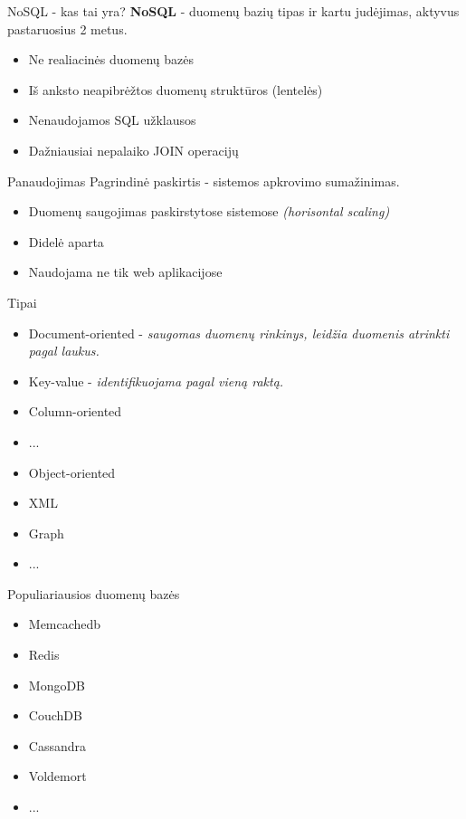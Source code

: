 \documentclass[12pt,a4paper]{beamer}
\begin{document}
\begin{frame}{NoSQL - kas tai yra?}
	\textbf{NoSQL} - duomenų bazių tipas ir kartu judėjimas, aktyvus pastaruosius 2 metus.
	\vskip10pt
	\begin{itemize}
		\item Ne realiacinės duomenų bazės
		\item Iš anksto neapibrėžtos duomenų struktūros (lentelės)
		\item Nenaudojamos SQL užklausos
		\item Dažniausiai nepalaiko JOIN operacijų
	\end{itemize}
\end{frame}

\begin{frame}{Panaudojimas}
	Pagrindinė paskirtis - sistemos apkrovimo sumažinimas.
	\vskip10pt
	\begin{itemize}
		\item Duomenų saugojimas paskirstytose sistemose \textit{(horisontal scaling)}
		\item Didelė aparta
		\item Naudojama ne tik web aplikacijose
	\end{itemize}
\end{frame}


\begin{frame}{Tipai}
	\begin{itemize}
	\item<1-> Document-oriented - \textit{saugomas duomenų rinkinys, leidžia duomenis atrinkti pagal laukus.}
	\item<2-> Key-value - \textit{identifikuojama pagal vieną raktą.}
	\item<3-> Column-oriented
	\item<4-> ...
	\item<4-> Object-oriented
	\item<4-> XML
	\item<4-> Graph
	\item<4-> ...
	\end{itemize}
\end{frame}


\begin{frame}{Populiariausios duomenų bazės}
	\begin{itemize}
	\item Memcachedb
	\item Redis
	\item MongoDB
	\item CouchDB
	\item Cassandra
	\item Voldemort
	\item ...
	\end{itemize}
\end{frame}
\end{document}
